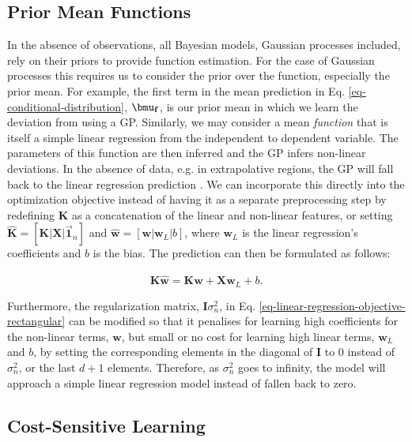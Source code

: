 \documentclass[useAMS,usenatbib,fleqn]{mn2e}
\begin{document}
\subsection{Prior Mean Functions}

In the absence of observations, all Bayesian models, Gaussian processes included, rely on their priors to provide function estimation. For the case of Gaussian processes this requires us to consider the prior over the function, especially the prior mean. For example, the first term in the mean prediction in Eq. \eqref{eq-conditional-distribution}, $\bmu_{\mathbf{f}}$, is our prior mean in which we learn the deviation from using a GP. Similarly, we may consider a mean \emph{function} that is itself a simple linear regression from the independent to dependent variable. The parameters of this function are then inferred and the GP infers non-linear deviations. In the absence of data, e.g. in extrapolative regions, the GP will fall back to the linear regression prediction \citep{roberts2012rs}. We can incorporate this directly into the optimization objective instead of having it as a separate preprocessing step by redefining $\mathbf{K}$ as a concatenation of the linear and non-linear features, or setting $\mathbf{\hat K}=[\mathbf{K}|\mathbf{X}|\vec{\mathbf{1}}_{n}]$ and $\mathbf{\hat w} = \left [\mathbf{w}|\mathbf{w}_{L}|b \right]$, where $\mathbf{w}_{L}$ is the linear regression's coefficients and $b$ is the bias. The prediction can then be formulated as follows:

\begin{equation}
\label{eq-joint-concatenation}
\mathbf{\hat K}\mathbf{\hat w} = \mathbf{K}\mathbf{w}+\mathbf{X}\mathbf{w}_{L}+b.
\end{equation}

Furthermore, the regularization matrix, $\mathbf{I}\sigma_{n}^{2}$, in Eq. \eqref{eq-linear-regression-objective-rectangular} can be modified so that it penalises for learning high coefficients for the non-linear terms, $\mathbf{w}$, but small or no cost for learning high linear terms, $\mathbf{w}_{L}$ and $b$, by setting the corresponding elements in the diagonal of $\mathbf{I}$ to 0 instead of $\sigma_{n}^{2}$, or the last $d+1$ elements. Therefore, as $\sigma_{n}^{2}$ goes to infinity, the model will approach a simple linear regression model instead of fallen back to zero.

\subsection{Cost-Sensitive Learning}
\end{document}
